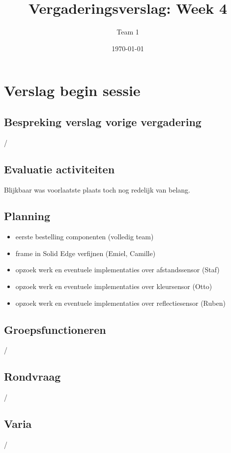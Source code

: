 \documentclass[a4paper,kulak]{kulakarticle} %
\date{\today}
\title{Vergaderingsverslag: Week 4}
\author{Team 1}
\begin{document}
\maketitle

\section{Verslag begin sessie}

\subsection{Bespreking verslag vorige vergadering}
/


\subsection{Evaluatie activiteiten}
Blijkbaar was voorlaatste plaats toch nog redelijk van belang. 


\subsection{Planning}
\begin{itemize}
	\item eerste bestelling componenten (volledig team)
	\item frame in Solid Edge verfijnen (Emiel, Camille)
	\item opzoek werk en eventuele implementaties over afstandssensor (Staf)
	\item opzoek werk en eventuele implementaties over kleursensor (Otto)
	\item opzoek werk en eventuele implementaties over reflectiesensor (Ruben)
	
\end{itemize}

\subsection{Groepsfunctioneren}
/

\subsection{Rondvraag}
/

\subsection{Varia}
/
\end{document}
